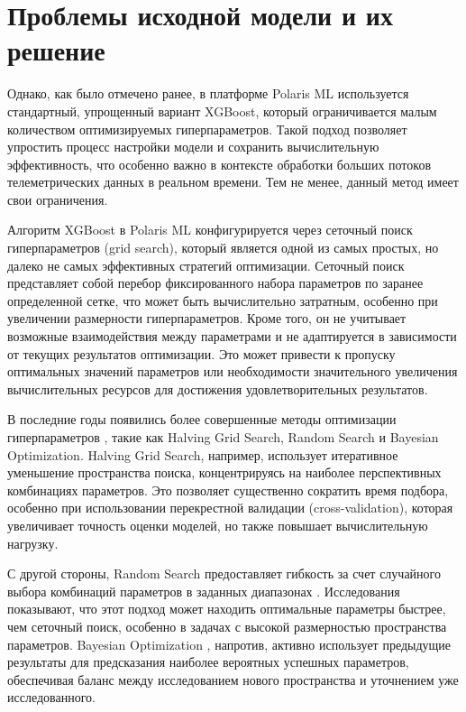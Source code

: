 \documentclass[14pt, a4paper]{src/bsu}
\begin{document}
\section{Проблемы исходной модели и их решение}

Однако, как было отмечено ранее, в платформе Polaris ML используется
стандартный, упрощенный вариант XGBoost, который ограничивается малым
количеством оптимизируемых гиперпараметров. Такой подход позволяет упростить
процесс настройки модели и сохранить вычислительную эффективность, что особенно
важно в контексте обработки больших потоков телеметрических данных в реальном
времени. Тем не менее, данный метод имеет свои ограничения.

Алгоритм XGBoost в Polaris ML конфигурируется через сеточный поиск
гиперпараметров (grid search), который является одной из самых простых, но
далеко не самых эффективных стратегий оптимизации. Сеточный поиск представляет
собой перебор фиксированного набора параметров по заранее определенной сетке,
что может быть вычислительно затратным, особенно при увеличении размерности
гиперпараметров. Кроме того, он не учитывает возможные взаимодействия между
параметрами и не адаптируется в зависимости от текущих результатов оптимизации.
Это может привести к пропуску оптимальных значений параметров или необходимости
значительного увеличения вычислительных ресурсов для достижения
удовлетворительных результатов.

В последние годы появились более совершенные методы оптимизации гиперпараметров
\cite{grid_search_tuning}, такие как Halving Grid Search, Random Search и
Bayesian Optimization. Halving Grid Search, например, использует итеративное
уменьшение пространства поиска, концентрируясь на наиболее перспективных
комбинациях параметров. Это позволяет существенно сократить время подбора,
особенно при использовании перекрестной валидации (cross-validation), которая
увеличивает точность оценки моделей, но также повышает вычислительную нагрузку.

С другой стороны, Random Search предоставляет гибкость за счет случайного
выбора комбинаций параметров в заданных диапазонах \cite{grid_search_tuning}.
Исследования показывают, что этот подход может находить оптимальные параметры
быстрее, чем сеточный поиск, особенно в задачах с высокой размерностью
пространства параметров. Bayesian Optimization \cite{grid_search_tuning},
напротив, активно использует предыдущие результаты для предсказания наиболее
вероятных успешных параметров, обеспечивая баланс между исследованием нового
пространства и уточнением уже исследованного.
\end{document}
